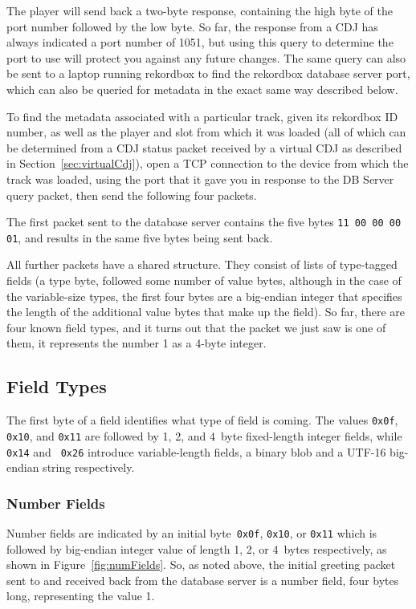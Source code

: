 \documentclass[11pt]{article}
\begin{document}
The player will send back a two-byte response, containing the high
byte of the port number followed by the low byte. So far, the response
from a CDJ has always indicated a port number of 1051, but using this
query to determine the port to use will protect you against any future
changes. The same query can also be sent to a laptop running rekordbox
to find the rekordbox database server port, which can also be queried
for metadata in the exact same way described below.

To find the metadata associated with a particular track, given its
rekordbox ID number, as well as the player and slot from which it was
loaded (all of which can be determined from a CDJ status packet
received by a virtual CDJ as described in
Section~\ref{sec:virtualCdj}), open a TCP connection to the device
from which the track was loaded, using the port that it gave you in
response to the DB Server query packet, then send the following four
packets.

The first packet sent to the database server contains the five bytes
{\tt 11 00 00 00 01}, and results in the same five bytes being sent
back.

All further packets have a shared structure. They consist of lists of
type-tagged fields (a type byte, followed some number of value bytes,
although in the case of the variable-size types, the first four bytes
are a big-endian integer that specifies the length of the additional
value bytes that make up the field). So far, there are four known
field types, and it turns out that the packet we just saw is one of
them, it represents the number 1 as a 4-byte integer.

\subsection{Field Types}

The first byte of a field identifies what type of field is coming. The
values {\tt 0x0f}, {\tt 0x10}, and {\tt 0x11} are followed by 1, 2,
and 4~byte fixed-length integer fields, while {\tt 0x14} and {\tt
  0x26} introduce variable-length fields, a binary blob and a UTF-16
big-endian string respectively.

\subsubsection{Number Fields}

Number fields are indicated by an initial byte~{\tt 0x0f}, {\tt 0x10},
or {\tt 0x11} which is followed by big-endian integer value of length
1, 2, or 4~bytes respectively, as shown in Figure~\ref{fig:numFields}.
So, as noted above, the initial greeting packet sent to and received
back from the database server is a number field, four bytes long,
representing the value 1.
\end{document}
